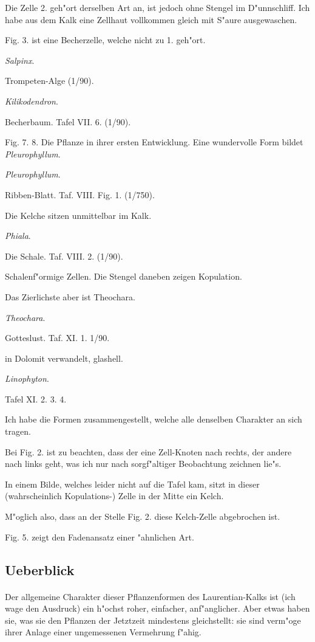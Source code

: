 \documentclass[a4paper, 11pt, oneside, german]{article}
\begin{document}
Die Zelle 2. geh"ort derselben Art an, ist jedoch ohne Stengel im D"unnschliff. Ich habe aus dem Kalk eine Zellhaut vollkommen gleich mit S"aure ausgewaschen.

Fig. 3. ist eine Becherzelle, welche nicht zu 1. geh"ort.

\emph{Salpinx}.

Trompeten-Alge (1/90).

\emph{Kilikodendron}.

Becherbaum. Tafel VII. 6. (1/90).

Fig. 7. 8. Die Pflanze in ihrer ersten Entwicklung. Eine wundervolle Form bildet \emph{Pleurophyllum}.

\emph{Pleurophyllum}.

Ribben-Blatt. Taf. VIII. Fig. 1. (1/750).

Die Kelche sitzen unmittelbar im Kalk.

\emph{Phiala}.

Die Schale. Taf. VIII. 2. (1/90).

Schalenf"ormige Zellen. Die Stengel daneben zeigen Kopulation.

Das Zierlichste aber ist Theochara.

\emph{Theochara}.

Gotteslust. Taf. XI. 1. 1/90.

in Dolomit verwandelt, glashell.

\emph{Linophyton}.

Tafel XI. 2. 3. 4.

Ich habe die Formen zusammengestellt, welche alle denselben Charakter an sich tragen.

Bei Fig. 2. ist zu beachten, dass der eine Zell-Knoten nach rechts, der andere nach links geht, was ich nur nach sorgf"altiger Beobachtung zeichnen lie"s.

In einem Bilde, welches leider nicht auf die Tafel kam, sitzt in dieser (wahrscheinlich Kopulations-) Zelle in der Mitte ein Kelch.

M"oglich also, dass an der Stelle Fig. 2. diese Kelch-Zelle abgebrochen ist.

Fig. 5. zeigt den Fadenansatz einer "ahnlichen Art.
\clearpage
\subsection{Ueberblick}
\paragraph{}
Der allgemeine Charakter dieser Pflanzenformen des Laurentian-Kalks ist (ich wage den Ausdruck) ein h"ochst roher, einfacher, anf"anglicher. Aber etwas haben sie, was sie den Pflanzen der Jetztzeit mindestens gleichstellt: sie sind verm"oge ihrer Anlage einer ungemessenen Vermehrung f"ahig.
\end{document}
